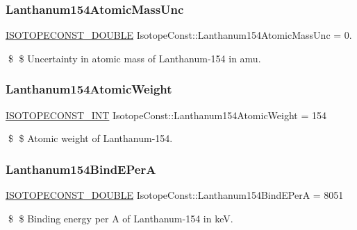 \subsubsection{\texorpdfstring{Lanthanum154\+Atomic\+Mass\+Unc}{Lanthanum154AtomicMassUnc}}
{\footnotesize\ttfamily \mbox{\hyperlink{group___isotope_const-_macros_ga8f45a7272ce02c0b4c65c44636ed719a}{I\+S\+O\+T\+O\+P\+E\+C\+O\+N\+S\+T\+\_\+\+D\+O\+U\+B\+LE}} Isotope\+Const\+::\+Lanthanum154\+Atomic\+Mass\+Unc = 0.}

\$ \$ Uncertainty in atomic mass of Lanthanum-\/154 in amu. \mbox{\label{group___isotope_const-_lanthanum-_la154_ga49818c5f90129c4610f93432f1d1d2ac}} 
\subsubsection{\texorpdfstring{Lanthanum154\+Atomic\+Weight}{Lanthanum154AtomicWeight}}
{\footnotesize\ttfamily \mbox{\hyperlink{group___isotope_const-_macros_ga5f18360b3e99483a35c32d789e62621c}{I\+S\+O\+T\+O\+P\+E\+C\+O\+N\+S\+T\+\_\+\+I\+NT}} Isotope\+Const\+::\+Lanthanum154\+Atomic\+Weight = 154}

\$ \$ Atomic weight of Lanthanum-\/154. \mbox{\label{group___isotope_const-_lanthanum-_la154_gabc956018b4b126906901e1e1d8f00162}} 
\subsubsection{\texorpdfstring{Lanthanum154\+Bind\+E\+PerA}{Lanthanum154BindEPerA}}
{\footnotesize\ttfamily \mbox{\hyperlink{group___isotope_const-_macros_ga8f45a7272ce02c0b4c65c44636ed719a}{I\+S\+O\+T\+O\+P\+E\+C\+O\+N\+S\+T\+\_\+\+D\+O\+U\+B\+LE}} Isotope\+Const\+::\+Lanthanum154\+Bind\+E\+PerA = 8051}

\$ \$ Binding energy per A of Lanthanum-\/154 in keV. \mbox{\label{group___isotope_const-_lanthanum-_la154_ga89c1a3ea913240ae6575adf845e83124}} 
